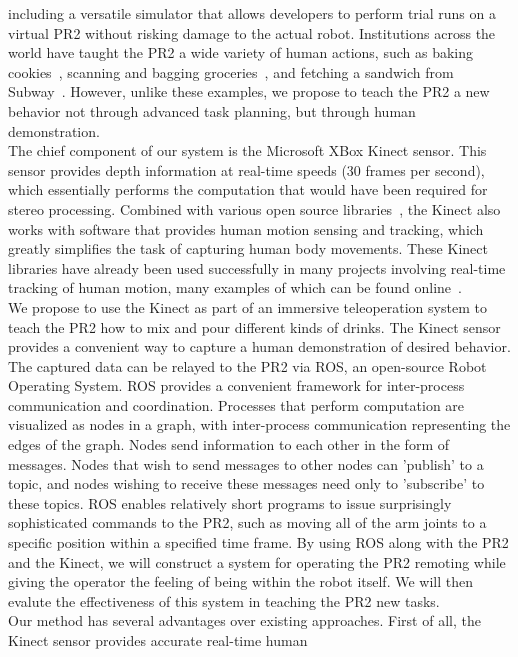 \documentclass{sig-alternate}
\begin{document}
including a versatile simulator that allows developers to perform trial runs on a virtual PR2 without
risking damage to the actual robot. Institutions across the world have taught the PR2 a wide variety of human actions, such as baking 
cookies~\cite{cookies}, scanning and bagging groceries~\cite{groceries}, and fetching a sandwich from 
Subway~\cite{subway}. However, unlike these examples, we propose to teach the PR2 a new behavior not through advanced task planning, but through human
demonstration. \\
\indent The chief component of our system is the Microsoft XBox Kinect sensor. This sensor provides depth information at real-time speeds
(30 frames per second), which essentially performs the computation that would have been required for stereo 
processing. Combined with various open source libraries~\cite{kinect}, the Kinect also works with 
software that provides human motion sensing and tracking, which greatly simplifies the task of capturing human body movements.
These Kinect libraries have already been used successfully in 
many projects involving real-time tracking of human motion, many examples of which can be found online~\cite{freenect}.\\
We propose to use the Kinect as part of an immersive teleoperation system to teach the PR2 how to mix and pour different kinds of drinks.
The Kinect sensor provides a convenient way to capture a human demonstration of desired behavior. The captured data can be relayed to the
PR2 via ROS, an open-source Robot Operating System\cite{ros}. ROS provides a convenient framework for inter-process communication and
coordination. Processes that perform computation are visualized as nodes in a graph, with inter-process communication representing the
edges of the graph. Nodes send information to each other in the form of messages. Nodes that wish to send messages to other nodes can
'publish' to a topic, and nodes wishing to receive these messages need only to 'subscribe' to these topics. ROS enables relatively short
programs to issue surprisingly sophisticated commands to the PR2, such as moving all of the arm joints to a specific position within a
specified time frame. By using ROS along with the PR2 and the Kinect, we will construct a system for operating the PR2 remoting while
giving the operator the feeling of being within the robot itself. We will then evalute the effectiveness of this system in teaching the PR2 new tasks.\\
\indent Our method has several advantages over existing approaches. First of all, the Kinect sensor provides accurate real-time human
\end{document}
